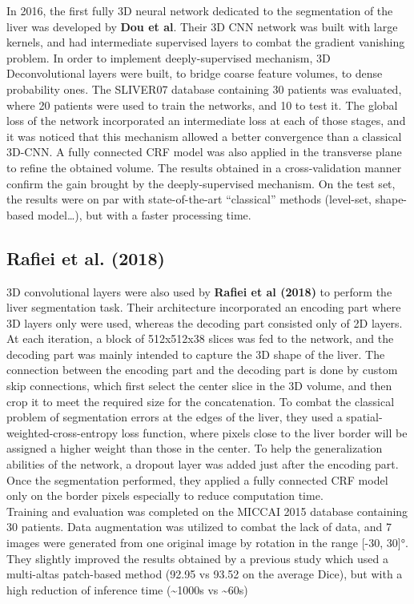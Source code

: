 In 2016, the first fully 3D neural network dedicated to the segmentation
of the liver was developed by \textbf{Dou et al}. Their 3D CNN network
was built with large kernels, and had intermediate supervised layers to
combat the gradient vanishing problem. In order to implement
deeply-supervised mechanism, 3D Deconvolutional layers were built, to
bridge coarse feature volumes, to dense probability ones. The SLIVER07
database containing 30 patients was evaluated, where 20 patients were
used to train the networks, and 10 to test it. The global loss of the
network incorporated an intermediate loss at each of those stages, and
it was noticed that this mechanism allowed a better convergence than a
classical 3D-CNN. A fully connected CRF model was also applied in the
transverse plane to refine the obtained volume. The results obtained in
a cross-validation manner confirm the gain brought by the
deeply-supervised mechanism. On the test set, the results were on par
with state-of-the-art ``classical'' methods (level-set, shape-based
model\ldots{}), but with a faster processing time.

\subsection*{Rafiei et al. (2018)}\label{rafiei-et-al.-2018}

3D convolutional layers were also used by \textbf{Rafiei et al (2018)}
to perform the liver segmentation task. Their architecture incorporated
an encoding part where 3D layers only were used, whereas the decoding
part consisted only of 2D layers. At each iteration, a block of
512x512x38 slices was fed to the network, and the decoding part was
mainly intended to capture the 3D shape of the liver. The connection
between the encoding part and the decoding part is done by custom skip
connections, which first select the center slice in the 3D volume, and
then crop it to meet the required size for the concatenation. To combat
the classical problem of segmentation errors at the edges of the liver,
they used a spatial-weighted-cross-entropy loss function, where pixels
close to the liver border will be assigned a higher weight than those in
the center. To help the generalization abilities of the network, a
dropout layer was added just after the encoding part. Once the
segmentation performed, they applied a fully connected CRF model only on
the border pixels especially to reduce computation time.\\
Training and evaluation was completed on the MICCAI 2015 database
containing 30 patients. Data augmentation was utilized to combat the
lack of data, and 7 images were generated from one original image by
rotation in the range {[}-30, 30{]}°.\\
They slightly improved the results obtained by a previous study which used a multi-altas patch-based method (92.95 vs 93.52 on
the average Dice), but with a high reduction of inference time
(\textasciitilde{}1000s vs \textasciitilde{}60s)

